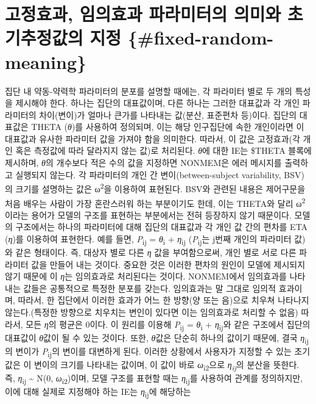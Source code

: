 \documentclass[
  10pt,
  krantz2,
  a4paper]{krantz}
\theoremstyle{definition}
\theoremstyle{definition}
\theoremstyle{definition}
\theoremstyle{remark}
\begin{document}
\hypertarget{uxace0uxc815uxd6a8uxacfc-uxc784uxc758uxd6a8uxacfc-uxd30cuxb77cuxbbf8uxd130uxc758-uxc758uxbbf8uxc640-uxcd08uxae30uxcd94uxc815uxac12uxc758-uxc9c0uxc815-fixed-random-meaning}{%
\section{\texorpdfstring{고정효과, 임의효과 파라미터의 의미와 초기추정값의 지정 \{\#fixed-random-meaning\}}{고정효과, 임의효과 파라미터의 의미와 초기추정값의 지정 \{\#fixed-random-meaning\}}}\label{uxace0uxc815uxd6a8uxacfc-uxc784uxc758uxd6a8uxacfc-uxd30cuxb77cuxbbf8uxd130uxc758-uxc758uxbbf8uxc640-uxcd08uxae30uxcd94uxc815uxac12uxc758-uxc9c0uxc815-fixed-random-meaning}}

집단 내 약동-약력학 파라미터의 분포를 설명할 때에는, 각 파라미터 별로 두 개의 특성을 제시해야 한다. 하나는 집단의 대표값이며, 다른 하나는 그러한 대표값과 각 개인 파라미터의 차이(변이)가 얼마나 큰가를 나타내는 값(분산, 표준편차 등)이다. 집단의 대표값은 THETA (\emph{θ})를 사용하여 정의되며, 이는 해당 인구집단에 속한 개인이라면 이 대표값과 유사한 파라미터 값을 가져야 함을 의미한다. 따라서, 이 값은 고정효과(각 개인 혹은 측정값에 따라 달라지지 않는 값)로 처리된다. \emph{θ}에 대한 IE는 \$THETA 블록에 제시하며, \emph{θ}의 개수보다 적은 수의 값을 지정하면 NONMEM은 에러 메시지를 출력하고 실행되지 않는다. 각 파라미터의 개인 간 변이(between-subject variability, BSV)의 크기를 설명하는 값은 ω\textsuperscript{2}을 이용하여 표현된다. BSV와 관련된 내용은 제어구문을 처음 배우는 사람이 가장 혼란스러워 하는 부분이기도 한데, 이는 THETA와 달리 ω\textsuperscript{2}이라는 용어가 모델의 구조를 표현하는 부분에서는 전혀 등장하지 않기 때문이다. 모델의 구조에서는 하나의 파라미터에 대해 집단의 대표값과 각 개인 값 간의 편차를 ETA (\emph{η})를 이용하여 표현한다. 예를 들면, \emph{P}\textsubscript{ij} = \emph{θ}\textsubscript{i} + \emph{η}\textsubscript{ij} (\emph{P}\textsubscript{ij}는 j번째 개인의 파라미터 값)와 같은 형태이다. 즉, 대상자 별로 다른 \emph{η} 값을 부여함으로써, 개인 별로 서로 다른 파라미터 값을 만들어 내는 것이다. 중요한 것은 이러한 편차의 원인이 모델에 제시되지 않기 때문에 이 \emph{η}는 임의효과로 처리된다는 것이다. NONMEM에서 임의효과를 나타내는 값들은 공통적으로 특정한 분포를 갖는다. 임의효과는 말 그대로 임의적 효과이며, 따라서, 한 집단에서 이러한 효과가 어느 한 방향(양 또는 음)으로 치우쳐 나타나지 않는다.(특정한 방향으로 치우치는 변인이 있다면 이는 임의효과로 처리할 수 없음) 따라서, 모든 \emph{η}의 평균은 0이다. 이 원리를 이용해 \emph{P}\textsubscript{ij} = \emph{θ}\textsubscript{i} + \emph{η}\textsubscript{ij}와 같은 구조에서 집단의 대표값이 \emph{θ}값이 될 수 있는 것이다. 또한, \emph{θ}값은 단순히 하나의 값이기 때문에, 결국 \emph{η}\textsubscript{ij}의 변이가 \emph{P}\textsubscript{ij}의 변이를 대변하게 된다. 이러한 상황에서 사용자가 지정할 수 있는 초기값은 이 변이의 크기를 나타내는 값이며, 이 값이 바로 \emph{ω}\textsubscript{i2}으로 \emph{η\textsubscript{ij}}의 분산을 뜻한다. 즉, \emph{η}\textsubscript{ij} \textasciitilde{} N(0, \emph{ω}\textsubscript{i2})이며, 모델 구조를 표현할 때는 \emph{η}\textsubscript{ij}를 사용하여 관계를 정의하지만, 이에 대해 실제로 지정해야 하는 IE는 \emph{η}\textsubscript{ij}에 해당하는 
\end{document}
